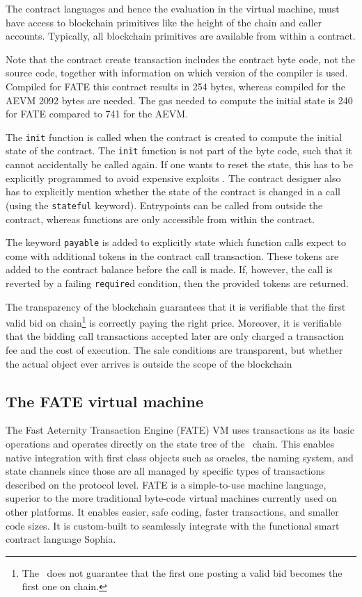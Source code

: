 The contract languages and hence the evaluation in the virtual
machine, must have access to blockchain primitives like the height of
the chain and caller accounts. Typically, all blockchain
primitives are available from within a contract.

Note that the contract create transaction includes the contract
byte code, not the source code, together with information on
which version of the compiler is used. Compiled for FATE this contract
results in 254 bytes, whereas compiled for the AEVM 2092 bytes are
needed. The gas needed to compute the initial state is 240 for FATE compared
to 741 for the AEVM.

The \texttt{init} function is called when the contract is created to
compute the initial state of the contract. The \texttt{init} function
is not part of the byte code, such that it cannot accidentally be
called again. If one wants to reset the state, this has to be
explicitly programmed to avoid expensive exploits
\cite{suiche2017280}.
The contract designer also has to explicitly mention whether the
state of the contract is changed in a call (using the
\texttt{stateful} keyword).
Entrypoints can be called from outside the contract, whereas functions
are only accessible from within the contract.

The keyword \texttt{payable} is added to explicitly state which
function calls expect to come with additional tokens in the contract
call transaction. These tokens are added to the contract balance
before the call is made. If, however, the call is reverted by a failing
\texttt{require}d condition, then the provided tokens are returned.

The transparency of the blockchain guarantees that it is verifiable
that the first valid bid on chain\footnote{The \blockchain\
  does not guarantee that the first one posting a valid bid becomes
  the first one on chain.} is correctly paying the right
price. Moreover, it is verifiable that the bidding call transactions accepted
later are
only charged a transaction fee and the cost of execution.
The sale conditions are transparent, but whether the actual object ever
arrives is outside the scope of the blockchain

\subsection{The FATE virtual machine}
\label{sect:fate}

The Fast Aeternity Transaction Engine (FATE) VM uses transactions as
its basic operations and operates directly on the state tree of the
\aet\ chain. This enables native integration with first class
objects such as oracles, the naming system, and state channels since
those are all managed by specific types of transactions described on
the protocol level. FATE is a simple-to-use machine language, superior
to the more traditional byte-code virtual machines currently used on
other platforms. It enables easier, safe coding, faster transactions,
and smaller code sizes. It is custom-built to seamlessly integrate
with the functional smart contract language Sophia.

